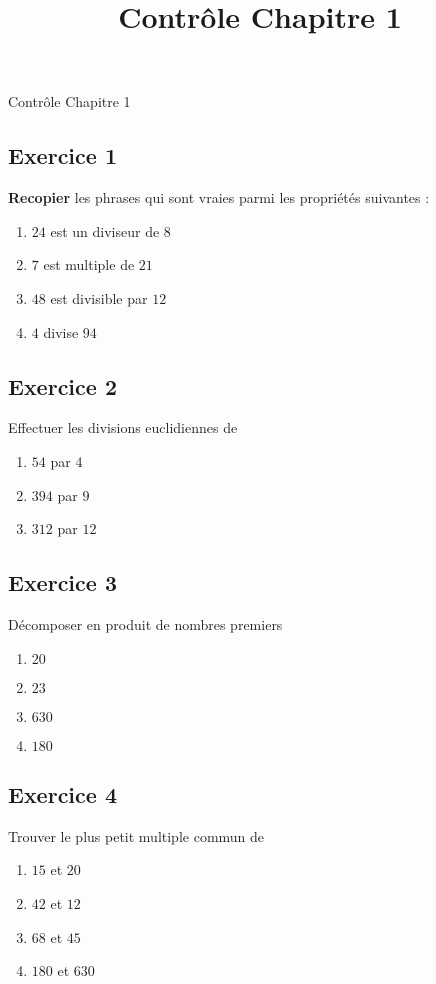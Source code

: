 \documentclass[12 pt]{extarticle}
\title{Contrôle Chapitre 1}
\date{}
\theoremstyle{plain}
\begin{document}
\begin{center}{\Large Contrôle Chapitre 1}\\ 
 \end{center}
 
 
 \subsection*{Exercice 1}

\textbf{Recopier} les phrases qui sont vraies parmi les propriétés suivantes :\begin{enumerate}
\item $24$ est un diviseur de $8$
\item $7$ est multiple de $21$ 
\item $48$ est divisible par $12$
\item $4$ divise $94$
\end{enumerate}
\subsection*{Exercice 2}
 Effectuer les divisions euclidiennes de 
 \begin{enumerate}
 \item $54$ par $4$
 \item $394$ par $9$
 \item $312$ par $12$
 \end{enumerate}
 
 \subsection*{Exercice 3} 
 Décomposer en produit de nombres premiers
 \begin{enumerate}
 \item $20$
 \item $23$
 \item $630$
 \item $180$
 \end{enumerate}
\subsection*{Exercice 4}
Trouver le plus petit multiple commun de 

\begin{enumerate}
\item $15$ et $20$
\item $42$ et $12$
\item $68$ et $45$
\item $180$ et $630$
\end{enumerate}
\end{document}
